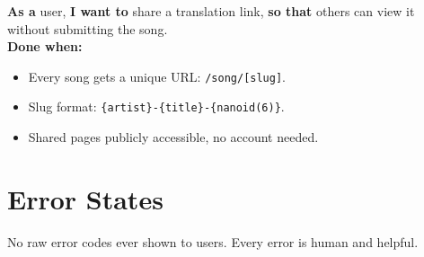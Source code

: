\documentclass[12pt, a4paper]{article}
\begin{document}
\begin{tcolorbox}[storybox, title={US-16 — Share a Translation}]
  \textbf{As a} user, \textbf{I want to} share a translation link,
  \textbf{so that} others can view it without submitting the song.\\[0.4em]
  \textbf{Done when:}
  \begin{itemize}
    \item Every song gets a unique URL: \texttt{/song/[slug]}.
    \item Slug format: \texttt{\{artist\}-\{title\}-\{nanoid(6)\}}.
    \item Shared pages publicly accessible, no account needed.
  \end{itemize}
\end{tcolorbox}

\section{Error States}

No raw error codes ever shown to users. Every error is human and helpful.
\end{document}
